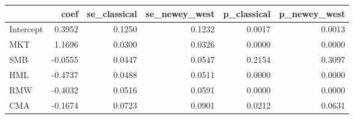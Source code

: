 \begin{tabular}{lrrrrr}
\toprule
 & coef & se\_classical & se\_newey\_west & p\_classical & p\_newey\_west \\
\midrule
Intercept & 0.3952 & 0.1250 & 0.1232 & 0.0017 & 0.0013 \\
MKT & 1.1696 & 0.0300 & 0.0326 & 0.0000 & 0.0000 \\
SMB & -0.0555 & 0.0447 & 0.0547 & 0.2154 & 0.3097 \\
HML & -0.4737 & 0.0488 & 0.0511 & 0.0000 & 0.0000 \\
RMW & -0.4032 & 0.0516 & 0.0591 & 0.0000 & 0.0000 \\
CMA & -0.1674 & 0.0723 & 0.0901 & 0.0212 & 0.0631 \\
\bottomrule
\end{tabular}
